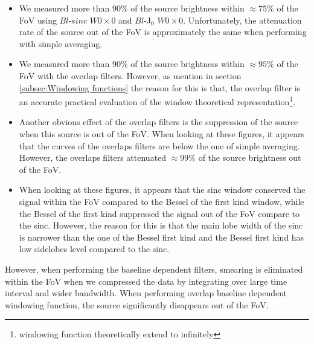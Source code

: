 \documentclass[useAMS,usenatbib]{mn2e}
\begin{document}
\begin{itemize}
 \item We measured more than $90\%$ of the source brightness within $\approx 75\%$ of the FoV using $Bl$-$sinc$ $W0 \times 0$ and 
      $Bl$-J$_0$ $W0\times0$. Unfortunately, the attenuation rate of the source out of the FoV is approximately the same when performing 
with simple averaging.
 \item We measured more than $90\%$ of the source brightness within $\approx 95\%$ of the FoV with the overlap filters. However, as mention 
in section \ref{subsec:Windowing functions} the reason for this is that, the overlap filter is an accurate practical evaluation of the 
window theoretical representation\footnote{windowing function theoretically extend to infinitely}. 
 \item Another obvious effect of the overlap filters is the suppression of the source when this source is out of the FoV. When
looking at these figures, it appears that the curves of the overlaps filters are below the one of simple averaging.  However, the overlaps 
filters attenuated $\approx 99\%$ of the source brightness out of the FoV.
  \item  When
looking at these figures, it appears that the sinc window conserved the signal within the FoV compared to the Bessel of the 
first kind window, while the Bessel of the first kind suppressed the signal out of the FoV compare to the sinc. However, the reason for 
this is that
the main lobe width of the sinc is narrower than the one of the Bessel first kind and the Bessel first kind has low 
sidelobes level compared to the sinc.
\end{itemize}
However, when performing the
baseline dependent ﬁlters, smearing is eliminated within the FoV when we compressed 
the data by integrating over large time interval and wider bandwidth. When performing overlap baseline dependent windowing function, the 
source significantly disappears out of the FoV.
\end{document}
